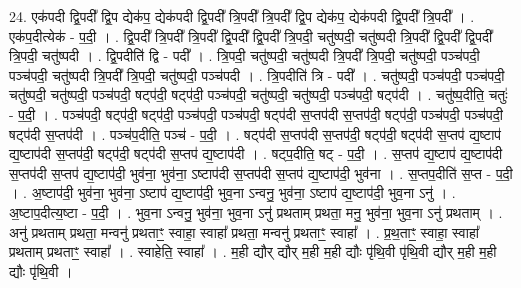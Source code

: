 \documentclass[17pt]{extarticle}
\begin{document}
24. एक॑पदी द्वि॒पदी᳚ द्वि॒प द्येक॑प॒ द्येक॑पदी द्वि॒पदी᳚ त्रि॒पदी᳚ त्रि॒पदी᳚ द्वि॒प द्येक॑प॒ द्येक॑पदी द्वि॒पदी᳚ त्रि॒पदी᳚ । . एक॑प॒दीत्येक॑ - प॒दी॒ । . द्वि॒पदी᳚ त्रि॒पदी᳚ त्रि॒पदी᳚ द्वि॒पदी᳚ द्वि॒पदी᳚ त्रि॒पदी॒ चतु॑ष्पदी॒ चतु॑ष्पदी त्रि॒पदी᳚ द्वि॒पदी᳚ द्वि॒पदी᳚ त्रि॒पदी॒ चतु॑ष्पदी । . द्वि॒पदीति॑ द्वि - पदी᳚ । . त्रि॒पदी॒ चतु॑ष्पदी॒ चतु॑ष्पदी त्रि॒पदी᳚ त्रि॒पदी॒ चतु॑ष्पदी॒ पञ्च॑पदी॒ पञ्च॑पदी॒ चतु॑ष्पदी त्रि॒पदी᳚ त्रि॒पदी॒ चतु॑ष्पदी॒ पञ्च॑पदी । . त्रि॒पदीति॑ त्रि - पदी᳚ । . चतु॑ष्पदी॒ पञ्च॑पदी॒ पञ्च॑पदी॒ चतु॑ष्पदी॒ चतु॑ष्पदी॒ पञ्च॑पदी॒ षट्प॑दी॒ षट्प॑दी॒ पञ्च॑पदी॒ चतु॑ष्पदी॒ चतु॑ष्पदी॒ पञ्च॑पदी॒ षट्प॑दी । . चतु॑ष्प॒दीति॒ चतुः॑ - प॒दी॒ । . पञ्च॑पदी॒ षट्प॑दी॒ षट्प॑दी॒ पञ्च॑पदी॒ पञ्च॑पदी॒ षट्प॑दी स॒प्तप॑दी स॒प्तप॑दी॒ षट्प॑दी॒ पञ्च॑पदी॒ पञ्च॑पदी॒ षट्प॑दी स॒प्तप॑दी । . पञ्च॑प॒दीति॒ पञ्च॑ - प॒दी॒ । . षट्प॑दी स॒प्तप॑दी स॒प्तप॑दी॒ षट्प॑दी॒ षट्प॑दी स॒प्तप॑ द्य॒ष्टाप॑ द्य॒ष्टाप॑दी स॒प्तप॑दी॒ षट्प॑दी॒ षट्प॑दी स॒प्तप॑ द्य॒ष्टाप॑दी । . षट्प॒दीति॒ षट् - प॒दी॒ । . स॒प्तप॑ द्य॒ष्टाप॑ द्य॒ष्टाप॑दी स॒प्तप॑दी स॒प्तप॑ द्य॒ष्टाप॑दी॒ भुव॑ना॒ भुव॑ना॒ ऽष्टाप॑दी स॒प्तप॑दी स॒प्तप॑ द्य॒ष्टाप॑दी॒ भुव॑ना । . स॒प्तप॒दीति॑ स॒प्त - प॒दी॒ । . अ॒ष्टाप॑दी॒ भुव॑ना॒ भुव॑ना॒ ऽष्टाप॑ द्य॒ष्टाप॑दी॒ भुव॒ना ऽन्वनु॒ भुव॑ना॒ ऽष्टाप॑ द्य॒ष्टाप॑दी॒ भुव॒ना ऽनु॑ । . अ॒ष्टाप॒दीत्य॒ष्टा - प॒दी॒ । . भुव॒ना ऽन्वनु॒ भुव॑ना॒ भुव॒ना ऽनु॑ प्रथताम् प्रथता॒ मनु॒ भुव॑ना॒ भुव॒ना ऽनु॑ प्रथताम् । . अनु॑ प्रथताम् प्रथता॒ मन्वनु॑ प्रथताꣳ॒॒ स्वाहा॒ स्वाहा᳚ प्रथता॒ मन्वनु॑ प्रथताꣳ॒॒ स्वाहा᳚ । . प्र॒थ॒ताꣳ॒॒ स्वाहा॒ स्वाहा᳚ प्रथताम् प्रथताꣳ॒॒ स्वाहा᳚ । . स्वाहेति॒ स्वाहा᳚ । . म॒ही द्यौर् द्यौर् म॒ही म॒ही द्यौः पृ॑थि॒वी पृ॑थि॒वी द्यौर् म॒ही म॒ही द्यौः पृ॑थि॒वी । \newline
\end{document}
